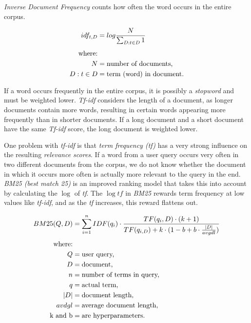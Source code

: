 \documentclass{article}
\begin{document}
\textit{Inverse Document Frequency} counts how often the word occurs in the entire corpus. 

\begin{align}
\begin{split}
	idf_{t,D} &= log\frac{N}{\sum_{D: t \in D} 1}\\[0.25\baselineskip]
	\text{where:}\\
	N &= \text{number of documents,}\\ 
	D: t \in D &= \text{term (word) in document.}
\end{split}
\end{align}

If a word occurs frequently in the entire corpus, it is possibly a \textit{stopword} and must be weighted lower. \textit{Tf-idf} considers the length of a document, as longer documents contain more words, resulting in certain words appearing more frequently than in shorter documents. If a long document and a short document have the same \textit{Tf-idf} score, the long document is weighted lower.

One problem with \textit{tf-idf} is that \textit{term frequency (tf)} has a very strong influence on the resulting \textit{relevance scores}. If a word from a user query occurs very often in two different documents from the corpus, we do not know whether the document in which it occurs more often is actually more relevant to the query in the end. \textit{BM25 (best match 25)} is an improved ranking model that takes this into account by calculating the $\log$ of \textit{tf}. The $\log{tf}$ in \textit{BM25} rewards term frequency at low values like \textit{tf-idf}, and as the \textit{tf} increases, this reward flattens out.

\begin{align}
\begin{split}
	BM25(Q,D) &= \sum_{i=1}^{n}IDF(q_{i})\cdot\frac{TF(q_{i},D)\cdot(k+1)}{TF(q_{i,D})+k\cdot(1-b+b\cdot\frac{|D|}{avgdl})}\\[0.25\baselineskip]
	\text{where:}\\
	Q &= \text{user query,}\\ 
	D &= \text{document,}\\
    n &= \text{number of terms in query,}\\
    q &= \text{actual term,}\\
    |D| &= \text{document length,}\\
    avdgl &= \text{average document length,}\\
    \text{k and b} &= \text{are hyperparameters.}\\
\end{split}
\end{align}
\end{document}
